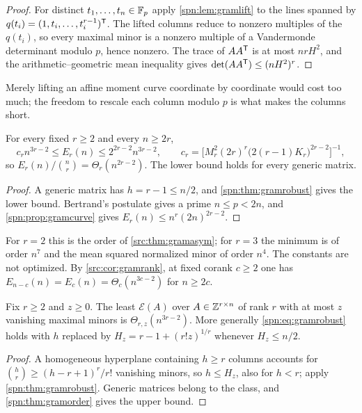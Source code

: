 \begin{proof}
For distinct $t_1,\dots,t_n\in\mathbb{F}_p$ apply \cref{spn:lem:gramlift} to the lines spanned by
$q(t_i)=(1,t_i,\dots,t_i^{r-1})^{\mathsf{T}}$. The lifted columns reduce to nonzero multiples of the $q(t_i)$, so every
maximal minor is a nonzero multiple of a Vandermonde determinant modulo $p$, hence nonzero. The trace of
$AA^{\mathsf{T}}$ is at most $nrH^2$, and the arithmetic--geometric mean inequality gives
$\det(AA^{\mathsf{T}})\le(nH^2)^r$.
\end{proof}

Merely lifting an affine moment curve coordinate by coordinate would cost too much; the freedom to rescale each
column modulo $p$ is what makes the columns short.

\begin{theorem}\label{spn:thm:gramorder}
For every fixed $r\ge2$ and every $n\ge2r$,
\[
 c_rn^{3r-2}\le E_r(n)\le2^{2r-2}n^{3r-2},\qquad
 c_r=\bigl[M_r^2(2r)^r\bigl(2(r-1)K_r\bigr)^{2r-2}\bigr]^{-1},
\]
so $E_r(n)/\binom nr=\Theta_r(n^{2r-2})$. The lower bound holds for every generic matrix.
\end{theorem}

\begin{proof}
A generic matrix has $h=r-1\le n/2$, and \cref{spn:thm:gramrobust} gives the lower bound. Bertrand's postulate
gives a prime $n\le p<2n$, and \cref{spn:prop:gramcurve} gives $E_r(n)\le n^r(2n)^{2r-2}$.
\end{proof}

For $r=2$ this is the order of \cref{src:thm:gramasym}; for $r=3$ the minimum is of order $n^7$ and the mean
squared normalized minor of order $n^4$. The constants are not optimized. By \cref{src:cor:gramrank}, at fixed
corank $c\ge2$ one has $E_{n-c}(n)=E_c(n)=\Theta_c(n^{3c-2})$ for $n\ge2c$.

\begin{corollary}\label{spn:cor:gramzeros}
Fix $r\ge2$ and $z\ge0$. The least $\mathcal E(A)$ over $A\in\mathbb{Z}^{r\times n}$ of rank $r$ with at most $z$
vanishing maximal minors is $\Theta_{r,z}(n^{3r-2})$. More generally \eqref{spn:eq:gramrobust} holds with $h$
replaced by $H_z=r-1+(r!z)^{1/r}$ whenever $H_z\le n/2$.
\end{corollary}

\begin{proof}
A homogeneous hyperplane containing $h\ge r$ columns accounts for $\binom hr\ge(h-r+1)^r/r!$ vanishing minors, so
$h\le H_z$, also for $h<r$; apply \cref{spn:thm:gramrobust}. Generic matrices belong to the class, and
\cref{spn:thm:gramorder} gives the upper bound.
\end{proof}

